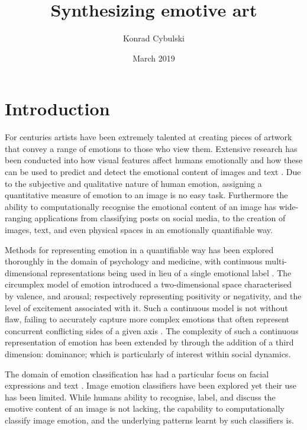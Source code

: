 \documentclass{article}
\title{Synthesizing emotive art}
\author{Konrad Cybulski}
\date{March 2019}
\begin{document}
	
\maketitle


\section{Introduction}

For centuries artists have been extremely talented at creating pieces of artwork that convey a range of emotions to those who view them.
Extensive research has been conducted into how visual features affect humans emotionally and how these can be used to predict and detect the emotional content of images and text \citep{machajdik2010affective, zhao2014exploring}.
Due to the subjective and qualitative nature of human emotion, assigning a quantitative measure of emotion to an image is no easy task.
Furthermore the ability to computationally recognise the emotional content of an image has wide-ranging applications from classifying posts on social media, to the creation of images, text, and even physical spaces in an emotionally quantifiable way.

Methods for representing emotion in a quantifiable way has been explored thoroughly in the domain of psychology and medicine, with continuous multi-dimensional representations being used in lieu of a single emotional label \citep{russell1980circumplex}.
The circumplex model of emotion introduced a two-dimensional space characterised by valence, and arousal; respectively representing positivity or negativity, and the level of excitement associated with it.
Such a continuous model is not without flaw, failing to accurately capture more complex emotions that often represent concurrent conflicting sides of a given axis \citep{larsen1992promises}.
The complexity of such a continuous representation of emotion has been extended by \citet{bradley1994measuring} through the addition of a third dimension: dominance; which is particularly of interest within social dynamics.

The domain of emotion classification has had a particular focus on facial expressions and text \citep{cambria2016affective, warriner2013norms}.
Image emotion classifiers have been explored \citep{kim2018building, machajdik2010affective, chen2015learning, chen2014deepsentibank} yet their use has been limited.
While humans ability to recognise, label, and discuss the emotive content of an image is not lacking, the capability to computationally classify image emotion, and the underlying patterns learnt by such classifiers is.
\end{document}
